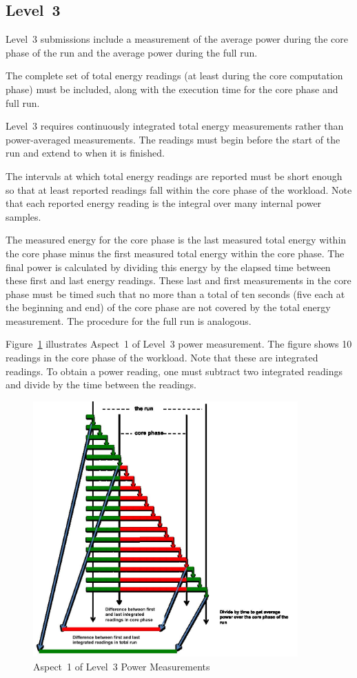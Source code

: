 \subsection{Level~3}

Level~3 submissions include a measurement of the average power during the core phase of the run and the average power during the full run.

The complete set of total energy readings (at least \MinMeasurementsCorePhaseLTwoThree{} during the core computation phase) must be included, along with the execution time for the core phase and full run.

Level~3 requires continuously integrated total energy measurements rather than power-averaged measurements.
The readings must begin before the start of the run and extend to when it is finished.

The intervals at which total energy readings are reported must be short enough so that at least \MinMeasurementsCorePhaseLTwoThree{} reported readings fall within the core phase of the workload.
Note that each reported energy reading is the integral over many internal power samples.

The measured energy for the core phase is the last measured total energy within the core phase minus the first measured total energy within the core phase.
The final power is calculated by dividing this energy by the elapsed time between these first and last energy readings.
These last and first measurements in the core phase must be timed such that no more than a total of ten seconds (five each at the beginning and end) of the core phase are not covered by the total energy measurement.
The procedure for the full run is analogous.

Figure~\ref{fig:a1l3pm} illustrates Aspect~1 of  Level~3 power measurement.
The figure shows 10 readings in the core phase of the workload.
Note that these are integrated readings.
To obtain a power reading, one must subtract two integrated readings and divide by the time between the readings.

\begin{figure}[t]
\centering
\includegraphics[width=4in]{fig3-5}
\caption{Aspect~1 of Level~3 Power Measurements}
\label{fig:a1l3pm}
\end{figure}


